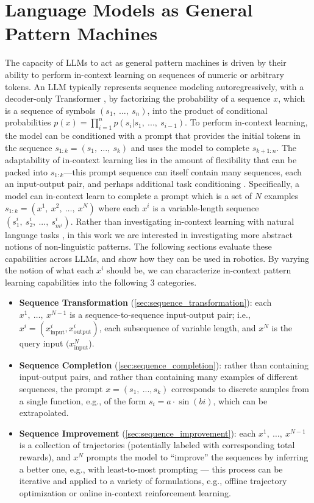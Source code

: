 \documentclass{article}
\newcommand{\ie}{i.e., }
\newcommand{\eg}{e.g., }
\begin{document}
\section{Language Models as General Pattern Machines}
\label{sec:result}
The capacity of LLMs to act as general pattern machines is driven by their ability to perform in-context learning on sequences of numeric or arbitrary tokens.
An LLM typically represents sequence modeling autoregressively, with a decoder-only Transformer \cite{vaswani2017attention}, by factorizing the probability of a sequence $x$, which is a sequence of symbols $(s_1, \ \ldots, \ s_n)$, into the product of conditional probabilities $p(x)=\prod_{i=1}^{n}p(s_i|s_1, \ ...,\ s_{i-1})$.
To perform in-context learning, the model can be conditioned with a prompt that provides the initial tokens in the sequence $s_{1:k} = (s_1, \ \ldots, \ s_k)$ and uses the model to complete $s_{k+1:n}$.
The adaptability of in-context learning lies in the amount of flexibility that can be packed into $s_{1:k}$---this prompt sequence can itself contain many sequences, each an input-output pair, and perhaps additional task conditioning  \cite{radford2019language,min2022rethinking}.  Specifically, a model can in-context learn to complete a prompt which is a set of $N$ examples $s_{1:k} =(x^{1}, \ x^{2}, \ \ldots, \ x^{N})$ where each $x^{i}$ is a variable-length sequence $(s^{i}_1, \ s^{i}_2, \ ..., \ s^{i}_{m^i})$.
Rather than investigating in-context learning with natural language tasks \cite{brown2020language}, in this work we are interested in investigating more abstract notions of non-linguistic patterns.
The following sections evaluate these capabilities across LLMs, and show how they can be used in robotics. By varying the notion of what each $x^{i}$ should be, we can characterize in-context pattern learning capabilities into the following 3 categories.
\begin{itemize}[leftmargin=*, topsep=0pt,itemsep=0ex,partopsep=1ex,parsep=1ex]
  \item \textbf{Sequence Transformation} (\cref{sec:sequence_transformation}): each $x^{1}, \ \ldots, \ x^{N-1}$ is a sequence-to-sequence input-output pair; \ie
  $x^{i} = (x^{i}_{\text{input}}, x^{i}_{\text{output}})$, each subsequence of variable length,
  and $x^{N}$ is the query input $(x^N_{\text{input}}$).
  \item \textbf{Sequence Completion} (\cref{sec:sequence_completion}): rather than containing input-output pairs, and rather than containing many examples of different sequences, the prompt $x = (s_1, \ ..., s_k)$ corresponds to discrete samples from a single function, \eg of the form $s_i = a \cdot \sin(bi)$, which can be extrapolated.
  \item \textbf{Sequence Improvement} (\cref{sec:sequence_improvement}): each $x^{1}, \ \ldots, \ x^{N-1}$ is a collection of trajectories (potentially labeled with corresponding total rewards), and  $x^{N}$ prompts the model to ``improve'' the sequences by inferring a better one, \eg with least-to-most prompting \cite{zhou2022least}---
  this process can be iterative and applied to a variety of formulations, \eg offline trajectory optimization or online in-context reinforcement learning.
\end{itemize}
\vspace{-1mm}
\end{document}
